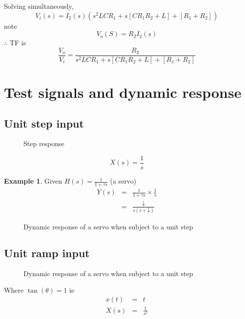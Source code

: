 \documentclass[11pt]{article} %
\theoremstyle{definition}
\newtheorem{example}{Example}[subsection]
\begin{document}
Solving simultaneously,
\begin{equation}
V_i(s)=I_2(s)\left( s^2LCR_1+s\left[ CR_1R_2+L\right] + \left[R_1+R_2\right]\right)
\end{equation}
note
\begin{equation}
V_o(S)=R_2I_2(s)
\end{equation}
$\therefore$ TF is
\begin{equation}
\frac{V_o}{V_i} = \frac{R_2}{s^2LCR_1+s\left[ CR_1R_2+L\right] + \left[R_1+R_2\right]}
\end{equation}

\section{Test signals and dynamic response}
\subsection{Unit step input}
	\begin{figure}[h]
		\centering
		\caption{Step response}
	\end{figure}
\begin{equation}
X(s)=\frac{1}{s}
\end{equation}
\begin{example}
Given $H(s)=\frac{1}{1+\tau s}$ (a servo)
\begin{eqnarray}
Y(s) &=& \frac{1}{1+\tau s} \times \frac{1}{s} \nonumber \\
&=& \frac{\frac{1}{\tau}}{s\left( s+ \frac{1}{\tau}\right)}
\end{eqnarray}

\begin{figure}[h]
	\centering
	\caption{Dynamic response of a servo when subject to a unit step}
\end{figure}

\end{example}


\subsection{Unit ramp input}
\begin{figure}[h]
	\centering
	\caption{Dynamic response of a servo when subject to a unit step}
\end{figure}
Where $\tan {(\theta)} = 1$ ie
\begin{eqnarray}
x(t) &=& t \nonumber \\
X(s) &=& \frac{1}{s^2}
\end{eqnarray}
\end{document}
